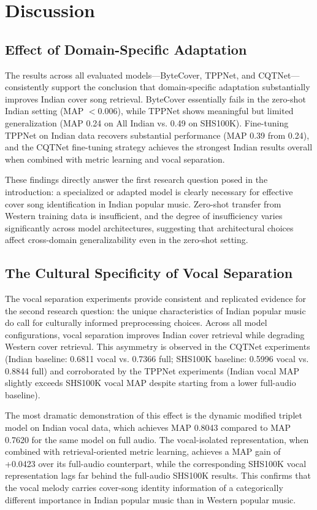 \documentclass[conference]{IEEEtran}
\begin{document}
\section{Discussion}

\subsection{Effect of Domain-Specific Adaptation}

The results across all evaluated models—ByteCover, TPPNet, and CQTNet—consistently support the conclusion that domain-specific adaptation substantially improves Indian cover song retrieval. ByteCover essentially fails in the zero-shot Indian setting (MAP $< 0.006$), while TPPNet shows meaningful but limited generalization (MAP 0.24 on All Indian vs. 0.49 on SHS100K). Fine-tuning TPPNet on Indian data recovers substantial performance (MAP 0.39 from 0.24), and the CQTNet fine-tuning strategy achieves the strongest Indian results overall when combined with metric learning and vocal separation.

These findings directly answer the first research question posed in the introduction: a specialized or adapted model is clearly necessary for effective cover song identification in Indian popular music. Zero-shot transfer from Western training data is insufficient, and the degree of insufficiency varies significantly across model architectures, suggesting that architectural choices affect cross-domain generalizability even in the zero-shot setting.

\subsection{The Cultural Specificity of Vocal Separation}

The vocal separation experiments provide consistent and replicated evidence for the second research question: the unique characteristics of Indian popular music do call for culturally informed preprocessing choices. Across all model configurations, vocal separation improves Indian cover retrieval while degrading Western cover retrieval. This asymmetry is observed in the CQTNet experiments (Indian baseline: 0.6811 vocal vs. 0.7366 full; SHS100K baseline: 0.5996 vocal vs. 0.8844 full) and corroborated by the TPPNet experiments (Indian vocal MAP slightly exceeds SHS100K vocal MAP despite starting from a lower full-audio baseline).

The most dramatic demonstration of this effect is the dynamic modified triplet model on Indian vocal data, which achieves MAP 0.8043 compared to MAP 0.7620 for the same model on full audio. The vocal-isolated representation, when combined with retrieval-oriented metric learning, achieves a MAP gain of +0.0423 over its full-audio counterpart, while the corresponding SHS100K vocal representation lags far behind the full-audio SHS100K results. This confirms that the vocal melody carries cover-song identity information of a categorically different importance in Indian popular music than in Western popular music.
\end{document}
